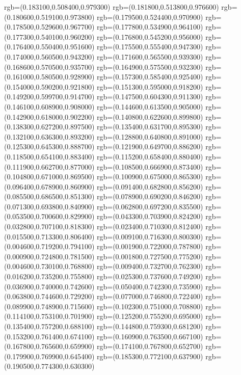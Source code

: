 {{		 rgb=(0.183100,0.508400,0.979300)
		 rgb=(0.181800,0.513800,0.976600)
		 rgb=(0.180600,0.519100,0.973800)
		 rgb=(0.179500,0.524400,0.970900)
		 rgb=(0.178500,0.529600,0.967700)
		 rgb=(0.177800,0.534900,0.964100)
		 rgb=(0.177300,0.540100,0.960200)
		 rgb=(0.176800,0.545200,0.956000)
		 rgb=(0.176400,0.550400,0.951600)
		 rgb=(0.175500,0.555400,0.947300)
		 rgb=(0.174000,0.560500,0.943200)
		 rgb=(0.171600,0.565500,0.939300)
		 rgb=(0.168600,0.570500,0.935700)
		 rgb=(0.164900,0.575500,0.932300)
		 rgb=(0.161000,0.580500,0.928900)
		 rgb=(0.157300,0.585400,0.925400)
		 rgb=(0.154000,0.590200,0.921800)
		 rgb=(0.151300,0.595000,0.918200)
		 rgb=(0.149200,0.599700,0.914700)
		 rgb=(0.147500,0.604300,0.911300)
		 rgb=(0.146100,0.608900,0.908000)
		 rgb=(0.144600,0.613500,0.905000)
		 rgb=(0.142900,0.618000,0.902200)
		 rgb=(0.140800,0.622600,0.899800)
		 rgb=(0.138300,0.627200,0.897500)
		 rgb=(0.135400,0.631700,0.895300)
		 rgb=(0.132100,0.636300,0.893200)
		 rgb=(0.128800,0.640800,0.891000)
		 rgb=(0.125300,0.645300,0.888700)
		 rgb=(0.121900,0.649700,0.886200)
		 rgb=(0.118500,0.654100,0.883400)
		 rgb=(0.115200,0.658400,0.880400)
		 rgb=(0.111900,0.662700,0.877000)
		 rgb=(0.108500,0.666900,0.873400)
		 rgb=(0.104800,0.671000,0.869500)
		 rgb=(0.100900,0.675000,0.865300)
		 rgb=(0.096400,0.678900,0.860900)
		 rgb=(0.091400,0.682800,0.856200)
		 rgb=(0.085500,0.686500,0.851300)
		 rgb=(0.078900,0.690200,0.846200)
		 rgb=(0.071300,0.693800,0.840900)
		 rgb=(0.062800,0.697200,0.835500)
		 rgb=(0.053500,0.700600,0.829900)
		 rgb=(0.043300,0.703900,0.824200)
		 rgb=(0.032800,0.707100,0.818300)
		 rgb=(0.023400,0.710300,0.812400)
		 rgb=(0.015500,0.713300,0.806400)
		 rgb=(0.009100,0.716300,0.800300)
		 rgb=(0.004600,0.719200,0.794100)
		 rgb=(0.001900,0.722000,0.787800)
		 rgb=(0.000900,0.724800,0.781500)
		 rgb=(0.001800,0.727500,0.775200)
		 rgb=(0.004600,0.730100,0.768800)
		 rgb=(0.009400,0.732700,0.762300)
		 rgb=(0.016200,0.735200,0.755800)
		 rgb=(0.025300,0.737600,0.749200)
		 rgb=(0.036900,0.740000,0.742600)
		 rgb=(0.050400,0.742300,0.735900)
		 rgb=(0.063800,0.744600,0.729200)
		 rgb=(0.077000,0.746800,0.722400)
		 rgb=(0.089900,0.748900,0.715600)
		 rgb=(0.102300,0.751000,0.708800)
		 rgb=(0.114100,0.753100,0.701900)
		 rgb=(0.125200,0.755200,0.695000)
		 rgb=(0.135400,0.757200,0.688100)
		 rgb=(0.144800,0.759300,0.681200)
		 rgb=(0.153200,0.761400,0.674100)
		 rgb=(0.160900,0.763500,0.667100)
		 rgb=(0.167800,0.765600,0.659900)
		 rgb=(0.174100,0.767800,0.652700)
		 rgb=(0.179900,0.769900,0.645400)
		 rgb=(0.185300,0.772100,0.637900)
		 rgb=(0.190500,0.774300,0.630300)
}}
